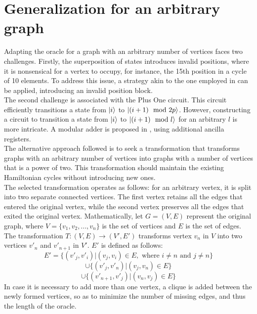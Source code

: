 \documentclass[10pt,a4paper]{article}
\begin{document}
\section{Generalization for an arbitrary graph}

Adapting the oracle for a graph with an arbitrary number of vertices faces two challenges. Firstly, the superposition of states introduces invalid positions, where it is nonsensical for a vertex to occupy, for instance, the 15th position in a cycle of 10 elements. To address this issue, a strategy akin to the one employed in \cite{Coloring1} can be applied, introducing an invalid position block.\\
The second challenge is associated with the Plus One circuit. This circuit efficiently transitions a state from $\ket{i}$ to $\ket{(i + 1) \mod 2p}$. However, constructing a circuit to transition a state from $\ket{i}$ to $\ket{(i + 1) \mod l}$ for an arbitrary $l$ is more intricate. A modular adder is proposed in \cite{modular}, using additional ancilla registers.\\
The alternative approach followed is to seek a transformation that transforms graphs with an arbitrary number of vertices into graphs with a number of vertices that is a power of two. This transformation should maintain the existing Hamiltonian cycles without introducing new ones.\\
The selected transformation operates as follows: for an arbitrary vertex, it is split into two separate connected vertices. The first vertex retains all the edges that entered the original vertex, while the second vertex preserves all the edges that exited the original vertex. Mathematically, let $G = (V, E)$ represent the original graph, where $V = \{v_1, v_2, ..., v_n\}$ is the set of vertices and $E$ is the set of edges. The transformation $T : (V, E) \rightarrow (V', E')$ transforms vertex $v_n$ in $V$ into two vertices $v'_n$ and $v'_{n+1}$ in $V'$. $E'$ is defined as follows:
$$ E' = \{(v'_j, v'_i) | (v_j, v_i) \in E, \text{ where } i \neq n \text{ and } j \neq n\} $$
$$\cup \{(v'_j, v'_n) | (v_j, v_n) \in E\} $$
$$\cup \{(v'_{n+1}, v'_j) | (v_n, v_j) \in E\} $$
In case it is necessary to add more than one vertex, a clique is added between the newly formed vertices, so as to minimize the number of missing edges, and thus the length of the oracle.
\end{document}
